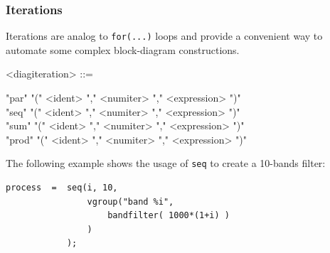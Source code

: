 \documentclass[a4paper]{book}
\begin{document}





 
\subsubsection{Iterations} 
Iterations are analog to \lstinline'for(...)' loops and provide a convenient way to automate some complex block-diagram constructions. 

\begin{grammar}
  <diagiteration> ::= 
  \begin{syntdiag}
    \begin{stack}
       "par" "(" <ident> "," <numiter> "," <expression> ")"\\
      "seq" "(" <ident> "," <numiter> "," <expression> ")"\\
      "sum" "(" <ident> "," <numiter> "," <expression> ")"\\
      "prod" "(" <ident> "," <numiter> "," <expression> ")"
    \end{stack}
  \end{syntdiag}
\end{grammar}

The following example shows the usage of  \lstinline'seq' to create a 10-bands filter:

\begin{lstlisting}
process  =	seq(i, 10, 
				vgroup("band %i", 
					bandfilter( 1000*(1+i) ) 
				) 
			);
\end{lstlisting}
\end{document}
